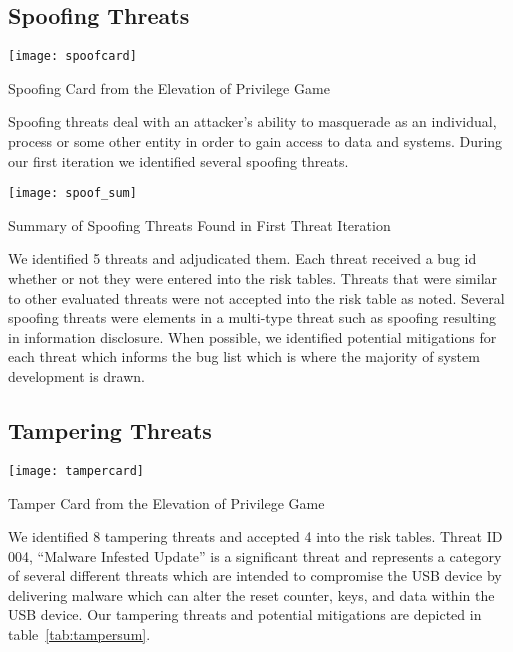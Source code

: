 \subsection{Spoofing Threats}
\begin{marginfigure}%
\centering
  \texttt{[image: spoofcard]}
  \caption{Spoofing Card from the Elevation of Privilege Game}
  \label{fig:spoofcard}
\end{marginfigure}
Spoofing threats deal with an attacker's ability to masquerade as an individual,
process or some other entity in order to gain access to data and systems.
During our first iteration we identified several spoofing threats.

\begin{table*}[ht]
    \centering
    \texttt{[image: spoof\_sum]}
    \caption{Summary of Spoofing Threats Found in First Threat Iteration}
    \label{tab:spoofsum}
\end{table*}
We identified 5 threats and adjudicated them. Each threat received a bug id
whether or not they were entered into the risk tables.  Threats that were
similar to other evaluated threats were not accepted into the risk table as
noted. Several spoofing threats were elements in a multi-type threat such as
spoofing resulting in information disclosure. When possible, we identified
potential mitigations for each threat which informs the bug list which is where
the majority of system development is drawn.

\subsection{Tampering Threats}

\begin{marginfigure}%
\centering
  \texttt{[image: tampercard]}
  \caption{Tamper Card from the Elevation of Privilege Game}
  \label{fig:tampercardcard}
\end{marginfigure}

We identified 8 tampering threats and accepted 4 into the risk tables.  Threat ID 004,
``Malware Infested Update'' is a significant threat and represents a category of
several different threats which are intended to compromise the USB device by
delivering malware which can alter the reset counter, keys, and data within the
USB device. 
Our tampering threats and potential mitigations are depicted in
table~\ref{tab:tampersum}.

